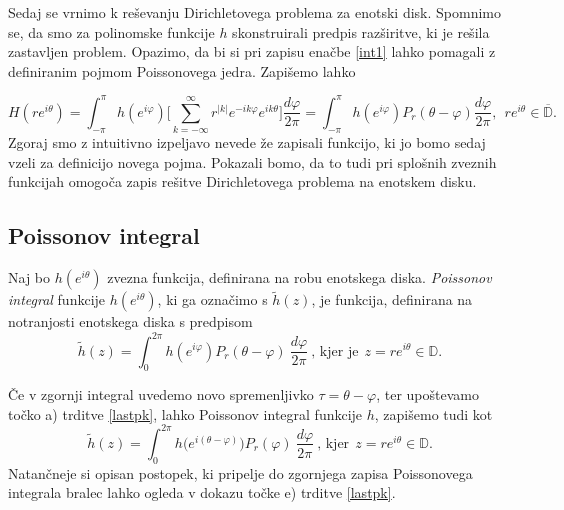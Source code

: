 \documentclass[mat1, tisk]{fmfdelo}
\begin{document}
    Sedaj se vrnimo k reševanju Dirichletovega problema za enotski disk. 
    Spomnimo se, da smo za polinomske funkcije $h$ skonstruirali predpis razširitve, ki je rešila zastavljen problem. 
    Opazimo, da bi si pri zapisu enačbe \eqref{int1} lahko pomagali z definiranim pojmom Poissonovega jedra. Zapišemo lahko
    
    $$
    H(r e^{i \theta}) = \int_{-\pi}^{\pi}{h(e^{i \varphi}) \bigg[\sum_{k = - \infty}^{\infty} r^{|k|} e^{- i k \varphi} e^{i k \theta}} \bigg]\frac{d \varphi}{2 \pi} = 
    \int_{-\pi}^{\pi}{h(e^{i \varphi}) P_r(\theta - \varphi)\frac{d \varphi}{2 \pi}},~~r e^{i \theta} \in \overline{\mathbb{D}}.
    $$
    Zgoraj smo z intuitivno izpeljavo nevede že zapisali funkcijo, ki jo bomo sedaj vzeli za definicijo novega pojma. 
    Pokazali bomo, da to tudi pri splošnih zveznih funkcijah omogoča zapis rešitve Dirichletovega problema na enotskem disku.

\subsection{Poissonov integral}
    \begin{definicija}
        Naj bo $h(e^{i \theta})$ zvezna funkcija, definirana na robu enotskega diska.
        \emph{Poissonov integral} funkcije $h(e^{i\theta})$, ki ga označimo s $\widetilde{h}(z)$, je funkcija, definirana na notranjosti enotskega diska s predpisom
        $$
        \widetilde{h}(z) = \int_{0}^{2\pi}{h(e^{i\varphi}) P_r(\theta - \varphi)~\frac{d\varphi}{2 \pi}}~\text{, kjer je}~~z = r e^{i\theta} \in \mathbb{D}.
        $$
     \end{definicija}
     \begin{opomba}
        \label{kom_poiss}
        Če v zgornji integral uvedemo novo spremenljivko $\tau = \theta - \varphi$, ter upoštevamo točko a) trditve \ref{lastpk}, lahko Poissonov integral funkcije $h$, zapišemo tudi kot
        $$
        \widetilde{h}(z) = \int_{0}^{2\pi}{h\big(e^{i(\theta-\varphi)}\big) P_r(\varphi)~\frac{d\varphi}{2 \pi}}~\text{, kjer}~~z = r e^{i\theta} \in \mathbb{D}.
        $$
        Natančneje si opisan postopek, ki pripelje do zgornjega zapisa Poissonovega integrala bralec lahko ogleda v dokazu točke e) trditve \ref{lastpk}.
     \end{opomba}
\end{document}
